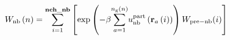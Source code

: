 \documentclass[12pt]{article}
\begin{document}
\begin{displaymath}
W_{\rm nb}\left(n\right) = 
\sum_{i=1}^{\bf nch\_nb}
\left[
{
{
\exp\left(-\beta {\sum_{a=1}^{n_{\rm g}\left(n\right)}} u_{\rm nb}^{\rm part}\left({\bf r}_a\left(i\right)\right)\right)
{
W_{\rm pre-nb}(i)
}
}
}
\right]
\end{displaymath}
\end{document}
